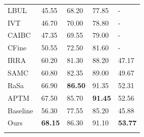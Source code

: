 \begin{figure}[!t]
\begin{minipage}[t]{0.45\linewidth}
\begin{minipage}[t]{1.0\linewidth}
{\begin{tabular}[h!]{p{3cm}|m{1.2cm}<{\centering}m{1.2cm}<{\centering}m{1.2cm}<{\centering}m{1.2cm}<{\centering}}
                LBUL~\cite{wang2022look}    & 45.55 & 68.20 & 77.85 & - \\
                IVT~\cite{shu2022see}       & 46.70 & 70.00 & 78.80 & - \\
                CAIBC~\cite{wang2022caibc}  & 47.35 & 69.55 & 79.00 & - \\
                CFine~\cite{yan2022clip}    & 50.55 & 72.50 & 81.60 & - \\
                IRRA~\cite{jiang2023cross}  & 60.20 & 81.30 & 88.20 & 47.17 \\
                SAMC~\cite{lu2024mind} & 60.80 & 82.35 & 89.00 & 49.67 \\
                RaSa~\cite{bai2023rasa}     & 66.90	& \textbf{86.50} & 91.35 & 52.31 \\
                APTM~\cite{yang2023towards} & 67.50	& 85.70 & \textbf{91.45} & 52.56 \\
                \hline
                Baseline & 56.30 & 77.55 & 85.20 & 45.88 \\
                Ours & \textbf{68.15} & 86.30 & 91.10 & \textbf{53.77}\\
                \shline
            \end{tabular}
        }
    \end{minipage}  
\end{minipage}  
\end{figure}